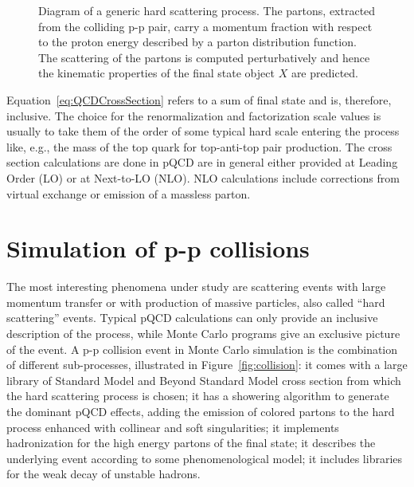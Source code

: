 \begin{figure}[hbt]\begin{center}
        \myskip\myskip
	\caption{Diagram of a generic hard scattering process. The partons, extracted from the colliding p-p pair,
  carry a momentum fraction with respect to the proton energy described by a parton distribution function. 
  The scattering of the partons is computed perturbatively and hence the kinematic properties of the final state object $X$ are predicted. \label{fig:hardscatter}}
\end{center}\end{figure}

Equation~\ref{eq:QCDCrossSection} refers to a sum of final state and is, therefore, inclusive. The choice for the 
renormalization and factorization scale values is usually to take them of the order of some typical hard scale 
entering the process like, e.g., the mass of the top quark for top-anti-top pair production.
The cross section calculations are done in pQCD are in general either provided at Leading Order (LO) 
or at Next-to-LO (NLO). NLO calculations include corrections from virtual exchange or emission of a massless parton.


\section{Simulation of p-p collisions}\label{sec:MCsimulation}

The most interesting phenomena under study are scattering events with 
large momentum transfer or with production of massive particles, also
called ``hard scattering'' events.
Typical pQCD calculations can only provide an inclusive description of
the process, while Monte Carlo programs give an exclusive picture
of the event. 
A p-p collision event in Monte Carlo simulation
is the combination of different sub-processes,
illustrated in Figure~\ref{fig:collision}: %
it comes with a large library of
Standard Model and Beyond Standard Model cross section from which the
hard scattering process is chosen; it has a showering algorithm to 
generate the dominant pQCD effects, adding the emission of colored partons
to the hard process enhanced with collinear and soft singularities;
it implements hadronization for the high energy partons of the final
state; it describes the underlying event according to some phenomenological
model; it includes libraries for the weak decay of unstable hadrons.

